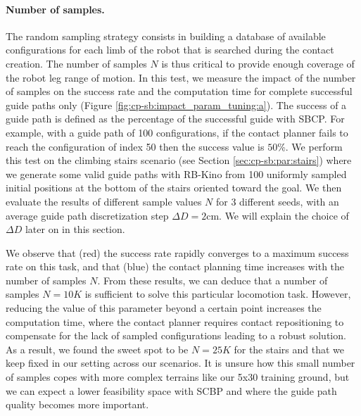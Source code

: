 \paragraph{Number of samples.}
The random sampling strategy consists in building a database of available configurations for each limb of the robot that is searched during the contact creation.
The number of samples $N$ is thus critical to provide enough coverage of the robot leg range of motion.
In this test, we measure the impact of the number of samples on the success rate and the computation time for complete successful guide paths only (Figure \ref{fig:cp-sb:impact_param_tuning:a}).
The success of a guide path is defined as the percentage of the successful guide with SBCP. For example, with a guide path of 100 configurations, if the contact planner fails to reach the configuration of index 50 then the success value is $50$\%.
We perform this test on the climbing stairs scenario (see Section \ref{sec:cp-sb:par:stairs}) where we generate some valid guide paths with RB-Kino from 100 uniformly sampled initial positions at the bottom of the stairs oriented toward the goal. 
We then evaluate the results of different sample values $N$ for 3 different seeds, with an average guide path discretization step $\Delta D = 2$cm. 
We will explain the choice of $\Delta D$ later on in this section.

We observe that (red) the success rate rapidly converges to a maximum success rate on this task, and that (blue) the contact planning time increases with the number of samples $N$.
From these results, we can deduce that a number of samples $N=10K$ is sufficient to solve this particular locomotion task.
However, reducing the value of this parameter beyond a certain point increases the computation time, where the contact planner requires contact repositioning to compensate for the lack of sampled configurations leading to a robust solution.
As a result, we found the sweet spot to be $N=25K$ for the stairs and that we keep fixed in our setting across our scenarios. 
It is unsure how this small number of samples copes with more complex terrains like our 5x30 training ground, but we can expect a lower feasibility space with SCBP and where the guide path quality becomes more important.


